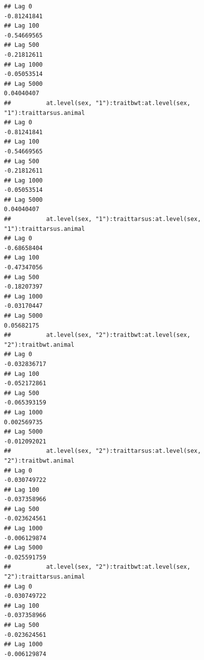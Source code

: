 \documentclass[
  12pt,
]{book}
\begin{document}
\begin{verbatim}
## Lag 0                                                          -0.81241841
## Lag 100                                                        -0.54669565
## Lag 500                                                        -0.21812611
## Lag 1000                                                       -0.05053514
## Lag 5000                                                        0.04040407
##          at.level(sex, "1"):traitbwt:at.level(sex, "1"):traittarsus.animal
## Lag 0                                                          -0.81241841
## Lag 100                                                        -0.54669565
## Lag 500                                                        -0.21812611
## Lag 1000                                                       -0.05053514
## Lag 5000                                                        0.04040407
##          at.level(sex, "1"):traittarsus:at.level(sex, "1"):traittarsus.animal
## Lag 0                                                             -0.68658404
## Lag 100                                                           -0.47347056
## Lag 500                                                           -0.18207397
## Lag 1000                                                          -0.03170447
## Lag 5000                                                           0.05682175
##          at.level(sex, "2"):traitbwt:at.level(sex, "2"):traitbwt.animal
## Lag 0                                                      -0.032836717
## Lag 100                                                    -0.052172861
## Lag 500                                                    -0.065393159
## Lag 1000                                                    0.002569735
## Lag 5000                                                   -0.012092021
##          at.level(sex, "2"):traittarsus:at.level(sex, "2"):traitbwt.animal
## Lag 0                                                         -0.030749722
## Lag 100                                                       -0.037358966
## Lag 500                                                       -0.023624561
## Lag 1000                                                      -0.006129874
## Lag 5000                                                      -0.025591759
##          at.level(sex, "2"):traitbwt:at.level(sex, "2"):traittarsus.animal
## Lag 0                                                         -0.030749722
## Lag 100                                                       -0.037358966
## Lag 500                                                       -0.023624561
## Lag 1000                                                      -0.006129874

\end{verbatim}
\end{document}
